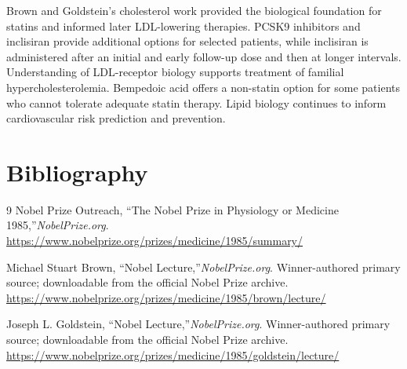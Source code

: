 Brown and Goldstein's cholesterol work provided the biological foundation for statins and informed later LDL-lowering therapies. PCSK9 inhibitors and inclisiran provide additional options for selected patients, while inclisiran is administered after an initial and early follow-up dose and then at longer intervals. Understanding of LDL-receptor biology supports treatment of familial hypercholesterolemia. Bempedoic acid offers a non-statin option for some patients who cannot tolerate adequate statin therapy. Lipid biology continues to inform cardiovascular risk prediction and prevention.


\section{Bibliography}

\begin{thebibliography}{9}
Nobel Prize Outreach, ``The Nobel Prize in Physiology or Medicine 1985,''\emph{NobelPrize.org}.\\
\url{https://www.nobelprize.org/prizes/medicine/1985/summary/}

Michael Stuart Brown, ``Nobel Lecture,''\emph{NobelPrize.org}. Winner-authored primary source; downloadable from the official Nobel Prize archive.\\
\url{https://www.nobelprize.org/prizes/medicine/1985/brown/lecture/}

Joseph L. Goldstein, ``Nobel Lecture,''\emph{NobelPrize.org}. Winner-authored primary source; downloadable from the official Nobel Prize archive.\\
\url{https://www.nobelprize.org/prizes/medicine/1985/goldstein/lecture/}
\end{thebibliography}
